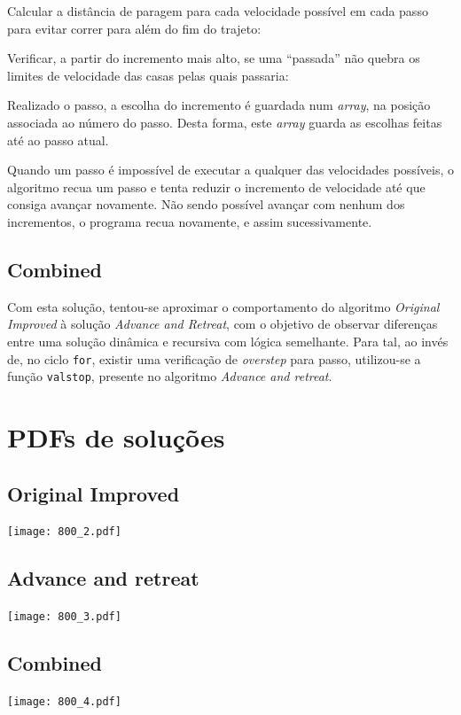\documentclass[portuguese,11pt,a4paper,titlepage]{article}
\newcommand{\foreign}[1]{\textit{#1}}
\newcommand{\srcdir}{..}
\begin{document}
Calcular a distância de paragem para cada velocidade possível em cada passo para evitar correr para além do fim do
trajeto:


Verificar, a partir do incremento mais alto, se uma ``passada'' não  quebra
os limites de velocidade das casas pelas quais passaria:


Realizado o passo, a escolha do incremento é guardada num \foreign{array},
na posição associada ao número do passo. Desta forma, este \foreign{array}
guarda as escolhas feitas até ao passo atual.

Quando um passo é impossível de executar a qualquer das velocidades possíveis,
o algoritmo recua um passo e tenta reduzir o incremento de velocidade até que
consiga avançar novamente. Não sendo possível avançar com nenhum dos incrementos,
o programa recua novamente, e assim sucessivamente.

\subsection{Combined}
Com esta solução, tentou-se aproximar o comportamento do algoritmo
\foreign{Original Improved} à solução \foreign{Advance and Retreat}, com o
objetivo de observar diferenças entre uma solução dinâmica e recursiva com
lógica semelhante.
Para tal, ao invés de, no ciclo \verb#for#, existir uma verificação de
\foreign{overstep} para passo, utilizou-se a função \verb#valstop#, presente no algoritmo \foreign{Advance and retreat}.

\pagebreak

\section{PDFs de soluções}
\subsection{Original Improved}
\texttt{[image: 800\_2.pdf]}
\subsection{Advance and retreat}
\texttt{[image: 800\_3.pdf]}
\subsection{Combined}
\texttt{[image: 800\_4.pdf]}
\pagebreak
\end{document}
